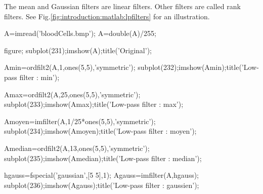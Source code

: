 The mean and Gaussian filters are linear filters. Other filters are called rank filters. See Fig.\ref{fig:introduction:matlab:lpfilters} for an illustration.
\begin{matlab}
A=imread('bloodCells.bmp');
A=double(A)/255;

figure;
subplot(231);imshow(A);title('Original');

Amin=ordfilt2(A,1,ones(5,5),'symmetric');
subplot(232);imshow(Amin);title('Low-pass filter : min');

Amax=ordfilt2(A,25,ones(5,5),'symmetric');
subplot(233);imshow(Amax);title('Low-pass filter : max');

Amoyen=imfilter(A,1/25*ones(5,5),'symmetric');
subplot(234);imshow(Amoyen);title('Low-pass filter : moyen');

Amedian=ordfilt2(A,13,ones(5,5),'symmetric');
subplot(235);imshow(Amedian);title('Low-pass filter : median');

hgauss=fspecial('gaussian',[5 5],1);
Agauss=imfilter(A,hgauss);
subplot(236);imshow(Agauss);title('Low-pass filter : gaussien');
\end{matlab}

